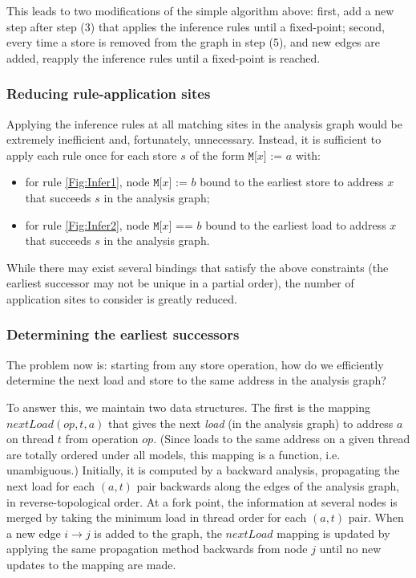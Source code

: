 \documentclass[11pt]{article}
\begin{document}
This leads to two modifications of the simple algorithm above: first,
add a new step after step (3) that applies the inference rules until a
fixed-point; second, every time a store is removed from the
graph in step (5), and new edges are added, reapply the inference rules
until a fixed-point is reached.

\subsubsection*{Reducing rule-application sites}

Applying the inference rules at all matching sites in the analysis
graph would be extremely inefficient and, fortunately, unnecessary.
Instead, it is sufficient to apply each rule once for each store $s$
of the form $\texttt{M[}x\texttt{] := } a$ with:

\begin{itemize}

\item for rule \ref{Fig:Infer1}, node $\texttt{M[}x\texttt{] := } b$
bound to the earliest store to address $x$ that succeeds
$s$ in the analysis graph;

\item for rule \ref{Fig:Infer2}, node $\texttt{M[}x\texttt{] == } b$
bound to the earliest load to address $x$ that succeeds
$s$ in the analysis graph.

\end{itemize}

\noindent While there may exist several bindings that satisfy the
above constraints (the earliest successor may not be unique in a
partial order), the number of application sites to consider is greatly
reduced.

\subsubsection*{Determining the earliest successors}

The problem now is: starting from any store operation, how do we
efficiently determine the next load and store to the same address in
the analysis graph?

To answer this, we maintain two data structures.  The first is the
mapping $nextLoad(op, t, a)$ that gives the next \emph{load} (in the
analysis graph) to address $a$ on thread $t$ from operation $op$.
(Since loads to the same address on a given thread are totally ordered
under all models, this mapping is a function, i.e. unambiguous.)
Initially, it is computed by a backward analysis, propagating the next
load for each $(a, t)$ pair backwards along the edges of the analysis
graph, in reverse-topological order.  At a fork point, the information
at several nodes is merged by taking the minimum load in thread order
for each $(a, t)$ pair.  When a new edge $i \rightarrow j$ is added to
the graph, the $nextLoad$ mapping is updated by applying the same
propagation method backwards from node $j$ until no new updates to the
mapping are made.
\end{document}
